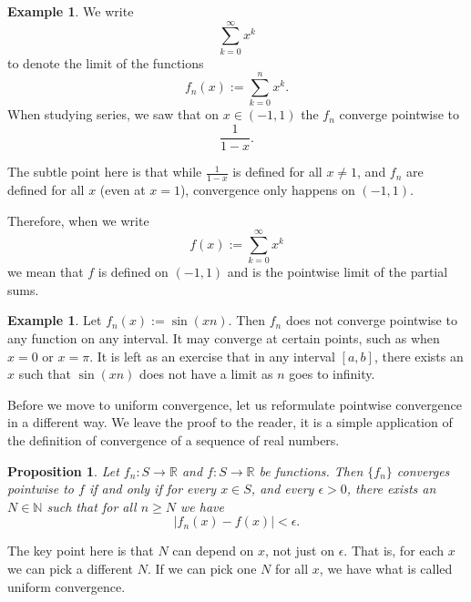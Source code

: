 \documentclass[12pt]{book}
\newcommand{\abs}[1]{\left\lvert {#1} \right\rvert}
\newcommand{\R}{{\mathbb{R}}}
\newcommand{\N}{{\mathbb{N}}}
\theoremstyle{plain}
\newtheorem{prop}[thm]{Proposition}
\theoremstyle{remark}
\theoremstyle{definition}
\theoremstyle{exercise}
\theoremstyle{example}
\newtheorem{example}[thm]{Example}
\begin{document}
\begin{example} \label{exercise:geomsumptconv}
We write
\begin{equation*}
\sum_{k=0}^\infty x^k
\end{equation*}
to denote the limit of the functions
\begin{equation*}
f_n(x) := \sum_{k=0}^n x^k .
\end{equation*}
When studying series, 
we saw that on $x \in (-1,1)$ the $f_n$ converge pointwise to
\begin{equation*}
\frac{1}{1-x} .
\end{equation*}

The subtle point here is that while
$\frac{1}{1-x}$ is defined for all $x \not=1$, and $f_n$ are 
defined for all $x$ (even at $x=1$), convergence only happens on $(-1,1)$.

Therefore, when we write
\begin{equation*}
f(x) := \sum_{k=0}^\infty x^k
\end{equation*}
we mean that $f$ is defined on $(-1,1)$ and is the pointwise limit
of the partial sums.
\end{example}

\begin{example}
Let $f_n(x) := \sin(xn)$.  Then $f_n$ does not converge pointwise
to any function on any interval.  It may converge at certain points, such
as when $x=0$ or $x=\pi$.  It is left as an exercise that in any interval
$[a,b]$, there exists an $x$ such that $\sin(xn)$ does not have a limit
as $n$ goes to infinity.
\end{example}

Before we move to uniform convergence, let us reformulate pointwise
convergence in a different way.
We leave the proof to the reader, it is a simple application of the
definition of convergence of a sequence of real numbers.

\begin{prop} \label{ptwsconv:prop}
Let $f_n \colon S \to \R$ and $f \colon S \to \R$ be functions.
Then $\{ f_n \}$ converges pointwise to $f$ if and only if
for every $x \in S$, and every $\epsilon > 0$, there exists
an $N \in \N$ such that for all
$n \geq N$ we have
\begin{equation*}
\abs{f_n(x)-f(x)} < \epsilon .
\end{equation*}
\end{prop}

The key point here is that $N$ can depend on $x$, not just on
$\epsilon$.  That is, for each $x$ we can pick a different $N$.
If we can pick one $N$ for all $x$, we have what is called
uniform convergence.
\end{document}
